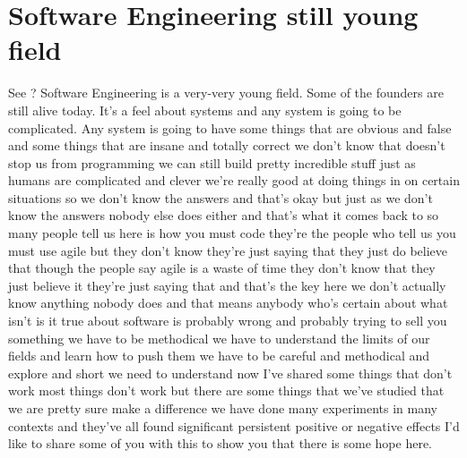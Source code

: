 \documentclass[conference, compsoc, twoside]{IEEEtran}
\begin{document}
\section{Software Engineering still young field} %
\label{sec:software_engineering_still_young_field}
See ? Software Engineering is a very-very young field.  Some of the founders are still alive today.  It's a feel about systems and any system is going to be complicated.  Any system is going to have some things that are obvious and false and some things that are insane and totally correct we don't know that doesn't stop us from programming we can still build pretty incredible stuff just as humans are complicated and clever we're really good at doing things in on certain situations so we don't know the answers and that's okay but just as we don't know the answers nobody else does either and that's what it comes back to so many people tell us here is how you must code they're the people who tell us you must use agile but they don't know they're just saying that they just do believe that though the people say agile is a waste of time they don't know that they just believe it they're just saying that and that's the key here we don't actually know anything nobody does and that means anybody who's certain about what isn't is it true about software is probably wrong and probably trying to sell you something we have to be methodical we have to understand the limits of our fields and learn how to push them we have to be careful and methodical and explore and short we need to understand now I've shared some things that don't work most things don't work but there are some things that we've studied that we are pretty sure make a difference we have done many experiments in many contexts and they've all found significant persistent positive or negative effects I'd like to share some of you with this to show you that there is some hope here.
\end{document}
